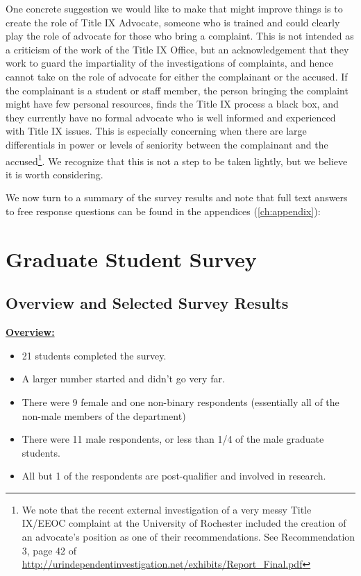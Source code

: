\documentclass[oneside]{book}   %
\begin{document}
One concrete suggestion we would like to make that might improve things is to create the role of Title IX Advocate, someone who is trained and could clearly play the role of advocate for those who bring a complaint. This is not intended as a criticism of the work of the Title IX Office, but an acknowledgement that they work to guard the impartiality of the investigations of complaints, and hence cannot take on the role of advocate for either the complainant or the accused. If the complainant is a student or staff member, the person bringing the complaint might have few personal resources, finds the Title IX process a black box, and they currently have no formal advocate who is well informed and experienced with Title IX issues. This is especially concerning when there are large differentials in power or levels of seniority between the complainant and the accused\footnote{We note that the recent external investigation of a very messy Title IX/EEOC complaint at the University of Rochester included the creation of an advocate’s position as one of their recommendations. See Recommendation 3, page 42 of \url{http://urindependentinvestigation.net/exhibits/Report_Final.pdf}}. We recognize that this is not a step to be taken lightly, but we believe it is worth considering.

We now turn to a summary of the survey results and note that full text answers to free response questions can be found in the appendices (\cref{ch:appendix}):


\chapter{Graduate Student Survey}
\label{ch:grads}
\section{Overview and Selected Survey Results}

\noindent\underline{\textbf{Overview:}}

\begin{itemize}
   	\item  21 students completed the survey.
	\item A larger number started and didn’t go very far. 
	\item There were 9 female and one non-binary respondents (essentially all of the non-male members of the department)
	\item There were 11 male respondents, or less than 1/4 of the male graduate students.
	\item All but 1 of the respondents are post-qualifier and involved in research.
\end{itemize}
\end{document}
